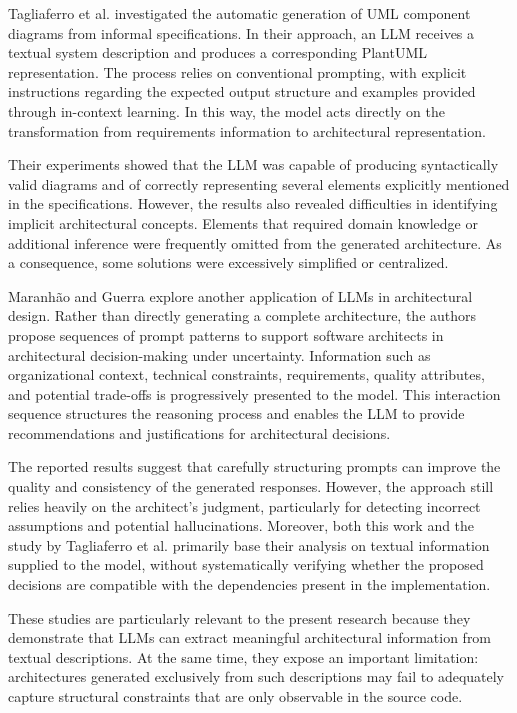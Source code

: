 \documentclass[acmsmall,screen,anonymous,review]{acmart}
\begin{document}
Tagliaferro et al. investigated the automatic generation of UML component diagrams from informal specifications. In their approach, an LLM receives a textual system description and produces a corresponding PlantUML representation. The process relies on conventional prompting, with explicit instructions regarding the expected output structure and examples provided through in-context learning. In this way, the model acts directly on the transformation from requirements information to architectural representation.

Their experiments showed that the LLM was capable of producing syntactically valid diagrams and of correctly representing several elements explicitly mentioned in the specifications. However, the results also revealed difficulties in identifying implicit architectural concepts. Elements that required domain knowledge or additional inference were frequently omitted from the generated architecture. As a consequence, some solutions were excessively simplified or centralized.

Maranhão and Guerra explore another application of LLMs in architectural design. Rather than directly generating a complete architecture, the authors propose sequences of prompt patterns to support software architects in architectural decision-making under uncertainty. Information such as organizational context, technical constraints, requirements, quality attributes, and potential trade-offs is progressively presented to the model. This interaction sequence structures the reasoning process and enables the LLM to provide recommendations and justifications for architectural decisions.

The reported results suggest that carefully structuring prompts can improve the quality and consistency of the generated responses. However, the approach still relies heavily on the architect's judgment, particularly for detecting incorrect assumptions and potential hallucinations. Moreover, both this work and the study by Tagliaferro et al. primarily base their analysis on textual information supplied to the model, without systematically verifying whether the proposed decisions are compatible with the dependencies present in the implementation.

These studies are particularly relevant to the present research because they demonstrate that LLMs can extract meaningful architectural information from textual descriptions. At the same time, they expose an important limitation: architectures generated exclusively from such descriptions may fail to adequately capture structural constraints that are only observable in the source code.
\end{document}
